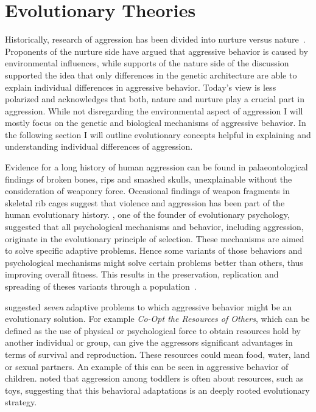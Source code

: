 \section{Evolutionary Theories}
\label{sec:evolutionary_theories}

Historically, research of aggression has been divided into nurture versus nature~\cite{Archer2009}. 
Proponents of the nurture side have argued that aggressive behavior is caused by environmental influences, while supports of the nature side of the discussion supported the idea that only differences in the genetic architecture are able to explain individual differences in aggressive behavior.
Today's view is less polarized and acknowledges that both, nature and nurture play a crucial part in aggression.
While not disregarding the environmental aspect of aggression I will mostly focus on the genetic and biological mechanisms of aggressive behavior.
In the following section I will outline evolutionary concepts helpful in explaining and understanding individual differences of aggression. 

Evidence for a long history of human aggression can be found in  palaeontological findings of broken bones, rips and smashed skulls, unexplainable without the consideration of weaponry force.
Occasional findings of weapon fragments in skeletal rib cages suggest that violence and aggression has been part of the human evolutionary history. 
\citet{Buss1997}, one of the founder of evolutionary psychology, suggested that all psychological mechanisms and behavior, including aggression, originate in the evolutionary principle of selection.  
These mechanisms are aimed to solve specific adaptive problems.
Hence some variants of those behaviors and psychological mechanisms might solve certain problems better than others, thus improving overall fitness.
This results in the preservation, replication and spreading of theses variants through a population~\cite{Buss1997}.

\citet{Buss1997} suggested \textit{seven} adaptive problems to which aggressive behavior might be an evolutionary solution.
For example \textit{Co-Opt the Resources of Others}, which can be defined as the use of physical or psychological force to obtain resources hold by another individual or group, can give the aggressors significant advantages in terms of survival and reproduction.
These resources could mean food, water, land or sexual partners.
An example of this can be seen in aggressive behavior of children.
\citet{Campbell1995} noted that aggression among toddlers is often about resources, such as toys, suggesting that this behavioral adaptations is an deeply rooted evolutionary strategy.

